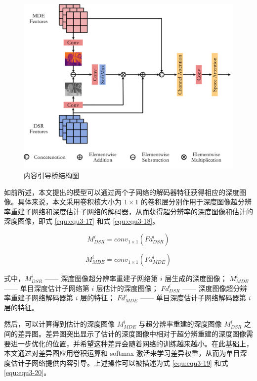 \begin{figure}[!htbp]
	\centering
	\includegraphics{figures/26.png}
	\caption{内容引导桥结构图}
	\label{fig:fig3-9}
\end{figure}

\newpage

如前所述，本文提出的模型可以通过两个子网络的解码器特征获得相应的深度图像。具体来说，本文采用卷积核大小为 $1\times 1$ 的卷积层分别作用于深度图像超分辨率重建子网络和深度估计子网络的解码器，从而获得超分辨率的深度图像和估计的深度图像，即式 \ref{equ:equ3-17} 和式 \ref{equ:equ3-18}。

\begin{equation}
	M_{DSR}^i=conv_{1\times1}\left(Fd_{DSR}^i\right)
		\label{equ:equ3-17}
\end{equation}

\begin{equation}
	M_{MDE}^i=conv_{1\times1}\left(Fd_{MDE}^i\right)
	\label{equ:equ3-18}
\end{equation}

\noindent 式中，$M_{DSR}^i$ —— 深度图像超分辨率重建子网络第 $i$ 层生成的深度图像；\newline
\indent\quad $M_{MDE}^i$ —— 单目深度估计子网络第 $i$ 层估计的深度图像；\newline
\indent\quad $Fd_{DSR}^i$ —— 深度图像超分辨率重建子网络解码器第 $i$ 层的特征；\newline
\indent\quad $Fd_{MDE}^i$ —— 单目深度估计子网络解码器第 $i$ 层的特征。

然后，可以计算得到估计的深度图像 $M_{MDE}^i$ 与超分辨率重建的深度图像 $M_{DSR}^i$ 之间的差异图。差异图突出显示了估计的深度图像中相对于超分辨重建的深度图像需要进一步优化的位置，并希望这种差异会随着网络的训练越来越小。在此基础上，本文通过对差异图应用卷积运算和 softmax 激活来学习差异权重，从而为单目深度估计子网络提供内容引导。上述操作可以被描述为式 \ref{equ:equ3-19} 和式 \ref{equ:equ3-20}。

